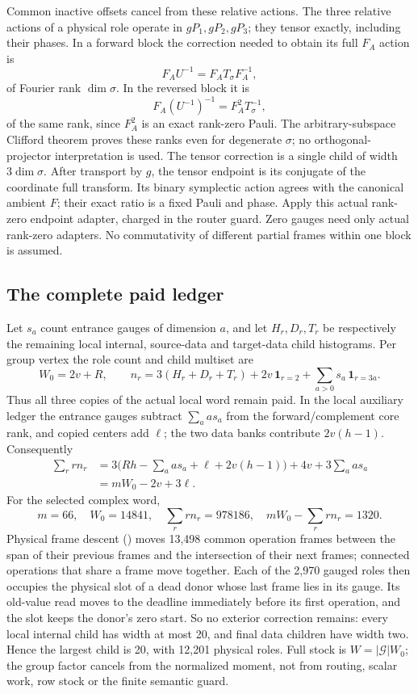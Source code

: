 Common inactive offsets cancel from these relative actions. The three
relative actions of a physical role operate in $gP_1,gP_2,gP_3$;
they tensor exactly, including their phases. In a forward block the
correction needed to obtain its full $F_A$ action is
\[
 F_AU^{-1}=F_AT_\sigma F_A^{-1},
\]
of Fourier rank $\dim\sigma$. In the reversed block it is
\[
 F_A(U^{-1})^{-1}=F_A^2T_\sigma^{-1},
\]
of the same rank, since $F_A^2$ is an exact rank-zero Pauli.
The arbitrary-subspace Clifford theorem proves these ranks even for
degenerate $\sigma$; no orthogonal-projector interpretation is used.
The tensor correction is a single child of width $3\dim\sigma$.
After transport by $g$, the tensor endpoint is its conjugate of the
coordinate full transform. Its binary symplectic action agrees with the
canonical ambient $F$; their exact ratio is a fixed Pauli and phase.
Apply this actual rank-zero endpoint adapter, charged in the router guard.
Zero gauges need only actual rank-zero adapters. No commutativity of
different partial frames within one block is assumed.

\subsection{The complete paid ledger}
Let $s_a$ count entrance gauges of dimension $a$, and let $H_r,D_r,T_r$
be respectively the remaining local internal, source-data and target-data
child histograms. Per group vertex the role count and child multiset are
\[
 W_0=2v+R,\qquad
 n_r=3(H_r+D_r+T_r)+2v\,\mathbf1_{r=2}
       +\sum_{a>0}s_a\,\mathbf1_{r=3a}.
\]
Thus all three copies of the actual local word remain paid. In the local
auxiliary ledger the entrance gauges subtract $\sum_a as_a$ from the
forward/complement core rank, and copied centers add $\ell$;
the two data banks contribute $2v(h-1)$. Consequently
\begin{align*}
 \sum_r rn_r
 &=3\bigl(Rh-\sum_a as_a+\ell+2v(h-1)\bigr)
       +4v+3\sum_a as_a\\
 &=mW_0-2v+3\ell.
\end{align*}
For the selected complex word,
\[
 m=66,\quad W_0=14841,\quad
 \sum_r rn_r=978186,\quad mW_0-\sum_r rn_r=1320.
\]
Physical frame descent () moves
13,498 common operation frames between the span of their previous frames
and the intersection of their next frames; connected operations that share
a frame move together. Each of the 2,970 gauged
roles then occupies the physical slot of a dead donor whose last frame
lies in its gauge. Its old-value read moves to the deadline immediately
before its first operation, and the slot keeps the donor's zero start.
So no exterior correction remains: every local internal child has width
at most 20, and final data children have width two. Hence the largest
child is 20, with 12,201 physical roles. Full stock is $W=|\mathcal G|W_0$;
the group factor cancels from the normalized moment, not from routing,
scalar work, row stock or the finite semantic guard.

